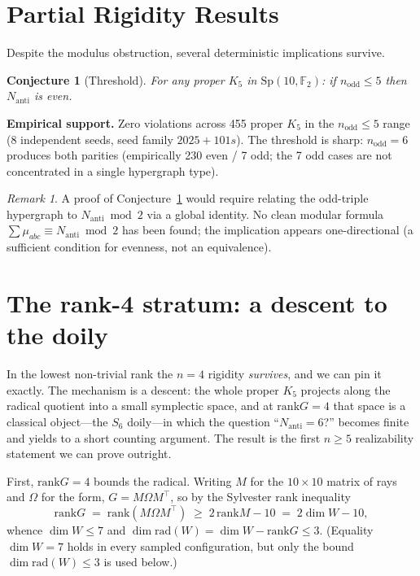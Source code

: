 \documentclass[11pt,a4paper]{article}
\newtheorem{conjecture}[theorem]{Conjecture}
\theoremstyle{remark}
\newtheorem{remark}[theorem]{Remark}
\newcommand{\Sp}{\mathrm{Sp}}
\newcommand{\rad}{\mathrm{rad}}
\newcommand{\rank}{\mathrm{rank}}
\newcommand{\Nanti}{N_{\mathrm{anti}}}
\begin{document}
\section{Partial Rigidity Results}\label{sec:partial}

Despite the modulus obstruction, several deterministic implications survive.

\begin{conjecture}[Threshold]\label{conj:threshold}
For any proper $K_5$ in $\Sp(10,\mathbb F_2)$: if $n_{\mathrm{odd}}\le5$ then
$\Nanti$ is even.
\end{conjecture}

\textbf{Empirical support.}  Zero violations across 455 proper $K_5$ in the
$n_{\mathrm{odd}}\le5$ range (8 independent seeds, seed family $2025+101s$).
The threshold is sharp: $n_{\mathrm{odd}}=6$ produces both parities
(empirically 230 even / 7 odd; the 7 odd cases are not concentrated in a single
hypergraph type).

\begin{remark}
A proof of Conjecture~\ref{conj:threshold} would require relating the odd-triple
hypergraph to $\Nanti\bmod2$ via a global identity.  No clean modular formula
$\sum\mu_{abc}\equiv\Nanti\bmod2$ has been found; the implication appears
one-directional (a sufficient condition for evenness, not an equivalence).
\end{remark}

\section{The rank-4 stratum: a descent to the doily}\label{sec:rank4}

In the lowest non-trivial rank the $n=4$ rigidity \emph{survives}, and we can pin it
exactly. The mechanism is a descent: the whole proper $K_5$ projects along the radical
quotient into a small symplectic space, and at $\rank G=4$ that space is a classical
object---the $S_6$ doily---in which the question ``$\Nanti=6$?'' becomes finite and
yields to a short counting argument. The result is the first $n\ge5$ realizability
statement we can prove outright.

First, $\rank G=4$ bounds the radical. Writing $M$ for the $10\times10$ matrix of rays
and $\Omega$ for the form, $G=M\Omega M^{\top}$, so by the Sylvester rank inequality
\[
  \rank G \;=\; \rank(M\Omega M^{\top}) \;\ge\; 2\,\rank M-10 \;=\; 2\dim W-10 ,
\]
whence $\dim W\le 7$ and $\dim\rad(W)=\dim W-\rank G\le 3$. (Equality $\dim W=7$ holds
in every sampled configuration, but only the bound $\dim\rad(W)\le3$ is used below.)
\end{document}
